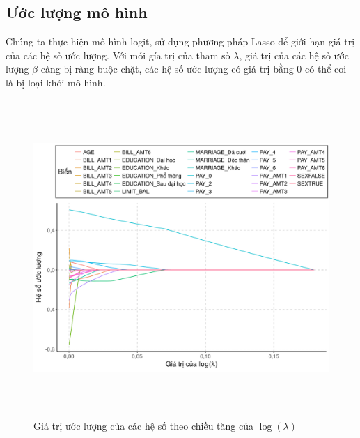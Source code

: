 \documentclass[a4paper]{report}\usepackage[]{graphicx}\usepackage[]{color}
\newenvironment{knitrout}{}{} %
\begin{document}
\subsection{Ước lượng mô hình} 


Chúng ta thực hiện mô hình logit, sử dụng phương pháp Lasso để giới hạn giá trị của các hệ số ước lượng. 
Với mỗi gía trị của tham số $\lambda$, giá trị của các hệ số ước lượng $\beta$ càng bị ràng buộc chặt, các hệ số ước lượng có giá trị bằng 0 có thể coi là bị loại khỏi mô hình.

\begin{figure}[h]
\centering
\capstart
\begin{knitrout}\small
{}\color{fgcolor}
\includegraphics[width=\textwidth,height=12cm]{Figures/lasso_coef-1} 

\end{knitrout}
\caption{Giá trị ước lượng của các hệ số theo chiều tăng của $\log(\lambda)$}
\label{fig:lasso_coef}
\end{figure}
\end{document}
